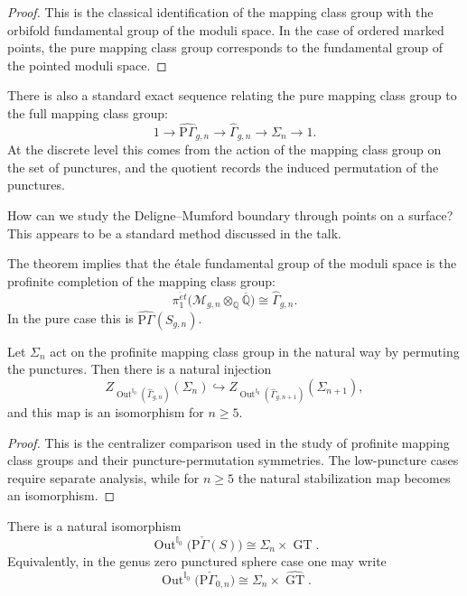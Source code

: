 \begin{proof}
This is the classical identification of the
mapping class group with the orbifold
fundamental group of the moduli space. In the
case of ordered marked points, the pure
mapping class group corresponds to the
fundamental group of the pointed moduli
space.
\end{proof}

\medskip\noindent
There is also a standard exact sequence
relating the pure mapping class group to the
full mapping class group:
$$
1\to \widehat{\mathrm{P}\Gamma}_{g,n}
\to \widehat{\Gamma}_{g,n}
\to \Sigma_n
\to 1.
$$
At the discrete level this comes from the
action of the mapping class group on the set
of punctures, and the quotient records the
induced permutation of the punctures.

\begin{remark}
How can we study the Deligne--Mumford
boundary through points on a surface? This
appears to be a standard method discussed in
the talk.
\end{remark}

\medskip\noindent
The theorem implies that the \'etale
fundamental group of the moduli space is the
profinite completion of the mapping class
group:
$$
\pi_1^{\acute{e}t}
\bigl(\mathcal{M}_{g,n}\otimes_{\mathbb{Q}}\overline{\mathbb{Q}}\bigr)
\cong
\widehat{\Gamma}_{g,n}.
$$
In the pure case this is
\(\widehat{\mathrm{P}\Gamma}(S_{g,n})\).

\begin{theorem}\label{thm:hoshi-mochizuki-centralizer}
Let \(\Sigma_n\) act on the profinite
mapping class group in the natural way by
permuting the punctures. Then there is a
natural injection
$$
Z_{\operatorname{Out}^{\mathbb{I}_0}
(\widehat{\Gamma}_{g,n})}(\Sigma_n)
\hookrightarrow
Z_{\operatorname{Out}^{\mathbb{I}_0}
(\widehat{\Gamma}_{g,n+1})}(\Sigma_{n+1}),
$$
and this map is an isomorphism for \(n\ge 5\).
\end{theorem}

\begin{proof}
This is the centralizer comparison used in
the study of profinite mapping class groups
and their puncture-permutation symmetries.
The low-puncture cases require separate
analysis, while for \(n\ge 5\) the natural
stabilization map becomes an isomorphism.
\end{proof}

\begin{theorem}\label{thm:hoshi-minamide-mochizuki}
There is a natural isomorphism
$$
\operatorname{Out}^{\mathbb{I}_0}
\bigl(\mathrm{P}\check\Gamma(S)\bigr)
\cong
\Sigma_n \times \widehat{\operatorname{GT}}.
$$
Equivalently, in the genus zero punctured
sphere case one may write
$$
\operatorname{Out}^{\mathbb{I}_0}
\bigl(\mathrm{P}\check\Gamma_{0,n}\bigr)
\cong
\Sigma_n \times \widehat{\operatorname{GT}}.
$$
\end{theorem}

